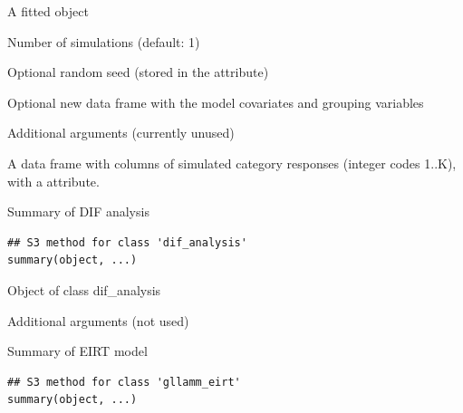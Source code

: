 \documentclass[a4paper]{book}
\begin{document}
\begin{Arguments}
\begin{ldescription}
\item[\code{object}] A fitted  object

\item[\code{nsim}] Number of simulations (default: 1)

\item[\code{seed}] Optional random seed (stored in the  attribute)

\item[\code{newdata}] Optional new data frame with the model covariates and
grouping variables

\item[\code{...}] Additional arguments (currently unused)
\end{ldescription}
\end{Arguments}
%
\begin{Value}
A data frame with  columns of simulated category
responses (integer codes 1..K), with a  attribute.
\end{Value}
%
\begin{Description}
Summary of DIF analysis
\end{Description}
%
\begin{Usage}
\begin{verbatim}
## S3 method for class 'dif_analysis'
summary(object, ...)
\end{verbatim}
\end{Usage}
%
\begin{Arguments}
\begin{ldescription}
\item[\code{object}] Object of class dif\_analysis

\item[\code{...}] Additional arguments (not used)
\end{ldescription}
\end{Arguments}
%
\begin{Description}
Summary of EIRT model
\end{Description}
%
\begin{Usage}
\begin{verbatim}
## S3 method for class 'gllamm_eirt'
summary(object, ...)
\end{verbatim}
\end{Usage}
\end{document}
